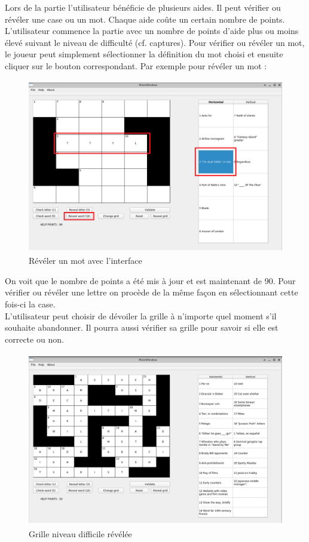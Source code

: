 \documentclass [ 11 pt ] {article}
\begin{document}
Lors de la partie l'utilisateur bénéficie de plusieurs aides. Il peut vérifier ou révéler une case ou un mot. Chaque aide coûte un certain nombre de points. L'utilisateur commence la partie avec un nombre de points d'aide plus ou moins élevé suivant le niveau de difficulté (cf. captures).
Pour vérifier ou révéler un mot, le joueur peut simplement sélectionner la définition du mot choisi et ensuite cliquer sur le bouton correspondant. Par exemple pour révéler un mot :
 \begin{figure}[H] 
 \center 
 \includegraphics[height=3in]{resultats/easy_reaveal_word_2.png}
 \caption{Révéler un mot avec l'interface}
 \end{figure}

On voit que le nombre de points a été mis à jour et est maintenant de 90.
Pour vérifier ou révéler une lettre on procède de la même façon en sélectionnant cette fois-ci la case. \\

L'utilisateur peut choisir de dévoiler la grille à n'importe quel moment s'il souhaite abandonner. Il pourra aussi vérifier sa grille pour savoir si elle est correcte ou non.
 \begin{figure}[H] 
 \center 
 \includegraphics[height=3in]{resultats/hard_remplie.png}
 \caption{Grille niveau difficile révélée}
 \end{figure}
\end{document}
